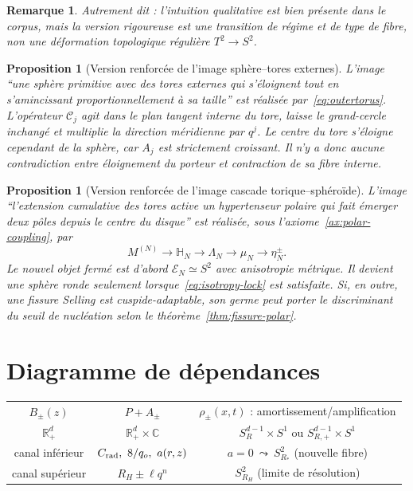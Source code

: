 \documentclass[11pt,a4paper]{article}
\newtheorem{proposition}[theorem]{Proposition}
\newtheorem{remark}[theorem]{Remarque}
\newcommand{\C}{\mathbb C}
\newcommand{\Rp}{\mathbb R_{+}}
\begin{document}
\begin{remark}
Autrement dit : l'intuition qualitative est bien présente dans le corpus, mais la version rigoureuse est une \emph{transition de régime et de type de fibre}, non une déformation topologique régulière $T^2\to S^2$.
\end{remark}


\begin{proposition}[Version renforcée de l'image sphère--tores externes]\label{prop:user-upper-v2}
L'image ``une sphère primitive avec des tores externes qui s'éloignent tout en s'amincissant proportionnellement à sa taille'' est réalisée par~\eqref{eq:outertorus}. L'opérateur $\mathcal C_j$ agit dans le plan tangent interne du tore, laisse le grand-cercle inchangé et multiplie la direction méridienne par $q^j$. Le centre du tore s'éloigne cependant de la sphère, car $A_j$ est strictement croissant. Il n'y a donc aucune contradiction entre \emph{éloignement du porteur} et \emph{contraction de sa fibre interne}.
\end{proposition}

\begin{proposition}[Version renforcée de l'image cascade torique--sphéroïde]\label{prop:user-lower-v2}
L'image ``l'extension cumulative des tores active un hypertenseur polaire qui fait émerger deux pôles depuis le centre du disque'' est réalisée, sous l'axiome~\ref{ax:polar-coupling}, par
\[
 M^{(N)}\longrightarrow \mathbb H_N
 \longrightarrow \Lambda_N
 \longrightarrow \mu_N
 \longrightarrow \eta_N^\pm.
\]
Le nouvel objet fermé est d'abord $\mathcal E_N\simeq S^2$ avec anisotropie métrique. Il devient une sphère ronde seulement lorsque~\eqref{eq:isotropy-lock} est satisfaite. Si, en outre, une fissure Selling est cuspide-adaptable, son germe peut porter le discriminant du seuil de nucléation selon le théorème~\ref{thm:fissure-polar}.
\end{proposition}

\section{Diagramme de dépendances}

\begin{center}
\begin{tabular}{c@{\quad$\longrightarrow$\quad}c@{\quad$\longrightarrow$\quad}c}
$B_\pm(z)$ & $P+A_\pm$ & $\rho_\pm(x,t)$ : amortissement/amplification\\[0.6em]
$\Rp^d$ & $\Rp^d\times\C$ & $S_R^{d-1}\times S^1$ ou $S_{R,+}^{d-1}\times S^1$\\[0.6em]
canal inférieur & $C_{\rm rad},\ 8/q_o,\ a(r,z)$ & $a=0\ \leadsto\ S^2_{R_*}$ (nouvelle fibre)\\[0.6em]
canal supérieur & $R_H\pm\ell q^n$ & $S^2_{R_H}$ (limite de résolution)
\end{tabular}
\end{center}
\end{document}
